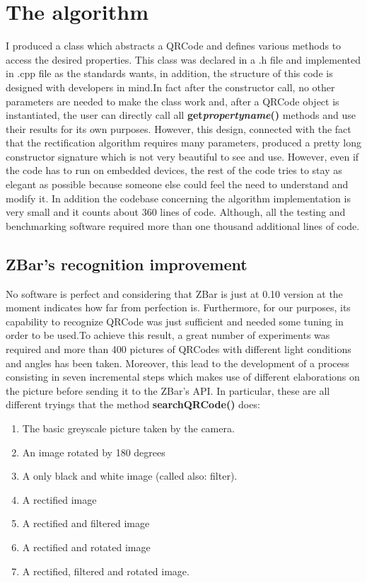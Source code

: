 \chapter{The algorithm}

I produced a class which abstracts a QRCode and defines various methods to access the desired properties. This class was declared in a .h file and implemented in .cpp file as the standards wants, in addition, the structure of this code is designed with developers in mind.In fact after the constructor call, no other parameters are needed to make the class work and, after a QRCode object is instantiated, the user can directly call all \textbf{get\textunderscore{}\emph{propertyname}()} methods and use their results for its own purposes. However, this design, connected with the fact that the rectification algorithm requires many parameters, produced a pretty long constructor signature which is not very beautiful to see and use. However, even if the code has to run on embedded devices, the rest of the code tries to stay as elegant as possible because someone else could feel the need to understand and modify it.
In addition the codebase concerning the algorithm implementation is very small and it counts about 360 lines of code. Although, all the testing and benchmarking software required more than one thousand additional lines of code.

\section{ZBar's recognition improvement} 
No software is perfect and considering that ZBar is just at 0.10 version at the moment indicates how far from perfection is. Furthermore, for our purposes, its capability to recognize QRCode was just sufficient and needed some tuning in order to be used.To achieve this result, a great number of experiments was required and more than 400 pictures of QRCodes with different light conditions and angles has been taken. Moreover, this lead to the development of a process consisting in seven incremental steps which makes use of different elaborations on the picture before sending it to the ZBar's API.
\newpage
In particular, these are all different tryings that the method \textbf{searchQRCode()} does:

\begin{enumerate}
	\item The basic greyscale picture taken by the camera.
	\item An image rotated by 180 degrees
	\item A only black and white image (called also: filter).
	\item A rectified image
	\item A rectified and filtered image
	\item A rectified and rotated image
	\item A rectified, filtered and rotated image.
\end{enumerate}

